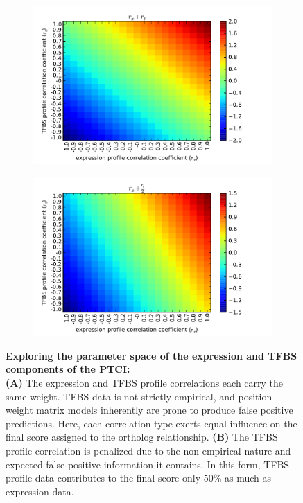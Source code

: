 



\begin{figure}[hp]
\centering
  \begin{subfigure}[b]{.9\linewidth}
    \centering

    \includegraphics[width=.9\linewidth]{figures/figs/thesis-xprn-tfbs.pdf}
    \caption{}
    \label{fig:ptci-space-a}
  \end{subfigure}%

  

  \begin{subfigure}[b]{.9\linewidth}
    \centering

    \includegraphics[width=.9\linewidth]{figures/figs/thesis-xprn-scaled-tfbs.pdf}
    \caption{}
    \label{fig:ptci-space-b}
  \end{subfigure}

\caption[Exploring the parameter space of the expression and TFBS components of the PTCI]{\sf \textbf{Exploring the parameter space of the expression and TFBS components of the PTCI:} \\
\textbf{(A)} The expression and \gls{TFBS} profile correlations each carry the same weight.  TFBS data is not strictly empirical, and position weight matrix models inherently are prone to produce false positive predictions. Here, each correlation-type exerts equal influence on the final score assigned to the ortholog relationship.  \textbf{(B)} The TFBS profile correlation is penalized due to the non-empirical nature and expected false positive information it contains. In this form, TFBS profile data contributes to the final score only 50\% as much as expression data.}
\label{fig:ptci-space}
\end{figure}
